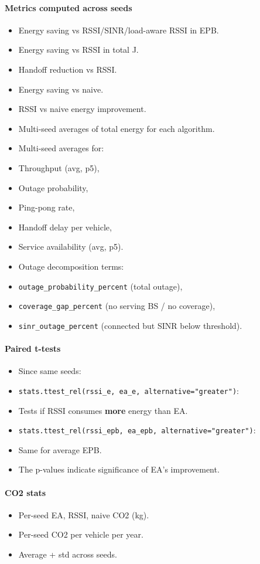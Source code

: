 \documentclass[conference]{IEEEtran}
\begin{document}
\paragraph*{Metrics computed across seeds}
\begin{itemize}
\item Energy saving vs RSSI/SINR/load-aware RSSI in EPB.
\item Energy saving vs RSSI in total J.
\item Handoff reduction vs RSSI.
\item Energy saving vs naive.
\item RSSI vs naive energy improvement.
\item Multi-seed averages of total energy for each algorithm.
\item Multi-seed averages for:
\item Throughput (avg, p5),
\item Outage probability,
\item Ping-pong rate,
\item Handoff delay per vehicle,
\item Service availability (avg, p5).
\item Outage decomposition terms:
\item \texttt{outage\_probability\_percent} (total outage),
\item \texttt{coverage\_gap\_percent} (no serving BS / no coverage),
\item \texttt{sinr\_outage\_percent} (connected but SINR below threshold).
\end{itemize}

\paragraph*{Paired t-tests}
\begin{itemize}
\item Since same seeds:
\item \texttt{stats.ttest\_rel(rssi\_e, ea\_e, alternative="greater")}:
\item Tests if RSSI consumes \textbf{more} energy than EA.
\item \texttt{stats.ttest\_rel(rssi\_epb, ea\_epb, alternative="greater")}:
\item Same for average EPB.
\item The p-values indicate significance of EA’s improvement.
\end{itemize}

\paragraph*{CO2 stats}
\begin{itemize}
\item Per-seed EA, RSSI, naive CO2 (kg).
\item Per-seed CO2 per vehicle per year.
\item Average + std across seeds.
\end{itemize}
\end{document}
